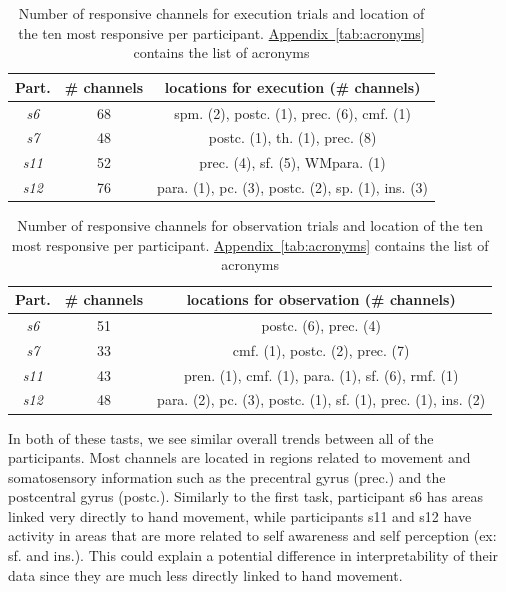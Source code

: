 \documentclass[10pt,conference,compsocconf]{IEEEtran}
\newcommand{\aref}[1]{\hyperref[#1]{Appendix~\ref*{#1}}}
\begin{document}
\begin{table}[h!]
  \centering
  \begin{tabular}{| c | c | c |}
      \hline
      Part. & \# channels & locations for execution (\# channels) \\
      \hline
      \textit{s6} & 68 & spm. (2), postc. (1), prec. (6), cmf. (1) \\
      \hline
      \textit{s7} & 48 & postc. (1), th. (1), prec. (8)\\
      \hline
      \textit{s11} & 52 & prec. (4), sf. (5), WMpara. (1)\\
      \hline
      \textit{s12} & 76 & para. (1), pc. (3), postc. (2), sp. (1), ins. (3)\\
      \hline
  \end{tabular}
  \caption{Number of responsive channels for execution trials and location of the ten most responsive per participant. \aref{tab:acronyms} contains the list of acronyms}
  \label{tab:exmovchannellocations}
\end{table}

\begin{table}[h!]
  \centering
  \begin{tabular}{| c | c | c |}
      \hline
      Part. & \# channels & locations for observation (\# channels) \\
      \hline
      \textit{s6} & 51 & postc. (6), prec. (4)\\
      \hline
      \textit{s7} & 33 & cmf. (1), postc. (2), prec. (7) \\
      \hline
      \textit{s11} & 43 & pren. (1), cmf. (1), para. (1), sf. (6), rmf. (1)\\
      \hline
      \textit{s12} & 48 & para. (2), pc. (3), postc. (1), sf. (1), prec. (1), ins. (2)\\
      \hline
  \end{tabular}
  \caption{Number of responsive channels for observation trials and location of the ten most responsive per participant. \aref{tab:acronyms} contains the list of acronyms}
  \label{tab:obsmovchannellocations}
\end{table}

In both of these tasts, we see similar overall trends between all of the participants. Most channels are located in regions related to movement and somatosensory information such as the precentral gyrus (prec.) and the postcentral gyrus (postc.). Similarly to the first task, participant s6 has areas linked very directly to hand movement, while participants s11 and s12 have activity in areas that are more related to self awareness and self perception (ex: sf. and ins.). This could explain a potential difference in interpretability of their data since they are much less directly linked to hand movement.
\end{document}
